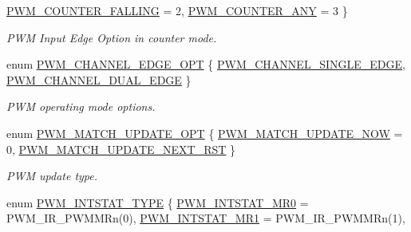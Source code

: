 \begin{DoxyCompactItemize}
\hyperlink{group___p_w_m___public___types_ggadf989578c354a90b57934758f01160e1a7514a25eafabb7c62419116e057e17fb}{\-P\-W\-M\-\_\-\-C\-O\-U\-N\-T\-E\-R\-\_\-\-F\-A\-L\-L\-I\-N\-G} =  2, 
\hyperlink{group___p_w_m___public___types_ggadf989578c354a90b57934758f01160e1a3ff6b6bd1e226c999ca9ee3a6b160a1a}{\-P\-W\-M\-\_\-\-C\-O\-U\-N\-T\-E\-R\-\_\-\-A\-N\-Y} =  3
 \}
\begin{DoxyCompactList}\small\item\em \-P\-W\-M \-Input \-Edge \-Option in counter mode. \end{DoxyCompactList}\item 
enum \hyperlink{group___p_w_m___public___types_ga4a602b4545cc4282b42128e10fbee114}{\-P\-W\-M\-\_\-\-C\-H\-A\-N\-N\-E\-L\-\_\-\-E\-D\-G\-E\-\_\-\-O\-P\-T} \{ \hyperlink{group___p_w_m___public___types_gga4a602b4545cc4282b42128e10fbee114a812daae4a50ee180115855eabfbc5d85}{\-P\-W\-M\-\_\-\-C\-H\-A\-N\-N\-E\-L\-\_\-\-S\-I\-N\-G\-L\-E\-\_\-\-E\-D\-G\-E}, 
\hyperlink{group___p_w_m___public___types_gga4a602b4545cc4282b42128e10fbee114a332cb30b88c9fe1b51bad0ae93726b2f}{\-P\-W\-M\-\_\-\-C\-H\-A\-N\-N\-E\-L\-\_\-\-D\-U\-A\-L\-\_\-\-E\-D\-G\-E}
 \}
\begin{DoxyCompactList}\small\item\em \-P\-W\-M operating mode options. \end{DoxyCompactList}\item 
enum \hyperlink{group___p_w_m___public___types_ga2fc566cd8e98b29646e97659db77f51b}{\-P\-W\-M\-\_\-\-M\-A\-T\-C\-H\-\_\-\-U\-P\-D\-A\-T\-E\-\_\-\-O\-P\-T} \{ \hyperlink{group___p_w_m___public___types_gga2fc566cd8e98b29646e97659db77f51ba37f7b5e91d86013c2feebc4ba400ad89}{\-P\-W\-M\-\_\-\-M\-A\-T\-C\-H\-\_\-\-U\-P\-D\-A\-T\-E\-\_\-\-N\-O\-W} =  0, 
\hyperlink{group___p_w_m___public___types_gga2fc566cd8e98b29646e97659db77f51ba0eb9c69641c3636ffd8ac21a26e83477}{\-P\-W\-M\-\_\-\-M\-A\-T\-C\-H\-\_\-\-U\-P\-D\-A\-T\-E\-\_\-\-N\-E\-X\-T\-\_\-\-R\-S\-T}
 \}
\begin{DoxyCompactList}\small\item\em \-P\-W\-M update type. \end{DoxyCompactList}\item 
enum \hyperlink{group___p_w_m___public___types_gae5985cfa9a69d6264bfa34769709693a}{\-P\-W\-M\-\_\-\-I\-N\-T\-S\-T\-A\-T\-\_\-\-T\-Y\-P\-E} \{ \*
\hyperlink{group___p_w_m___public___types_ggae5985cfa9a69d6264bfa34769709693aa411472849fe53f4717e899fc05800814}{\-P\-W\-M\-\_\-\-I\-N\-T\-S\-T\-A\-T\-\_\-\-M\-R0} =  \-P\-W\-M\-\_\-\-I\-R\-\_\-\-P\-W\-M\-M\-Rn(0), 
\hyperlink{group___p_w_m___public___types_ggae5985cfa9a69d6264bfa34769709693aad943245a060f73bc62af86d67ee4788b}{\-P\-W\-M\-\_\-\-I\-N\-T\-S\-T\-A\-T\-\_\-\-M\-R1} =  \-P\-W\-M\-\_\-\-I\-R\-\_\-\-P\-W\-M\-M\-Rn(1), 

\end{DoxyCompactItemize}

